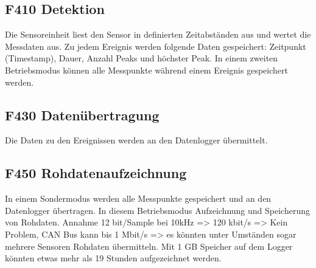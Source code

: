 \subsection{F410 Detektion}
Die Sensoreinheit liest den Sensor in definierten Zeitabständen aus und wertet die Messdaten aus. Zu jedem Ereignis werden folgende Daten gespeichert: Zeitpunkt (Timestamp), Dauer, Anzahl Peaks und höchster Peak. In einem zweiten Betriebsmodus können alle Messpunkte während einem Ereignis gespeichert werden.

\subsection{F430 Datenübertragung}
Die Daten zu den Ereignissen werden an den Datenlogger übermittelt.

\subsection{F450 Rohdatenaufzeichnung}
In einem Sondermodus werden alle Messpunkte gespeichert und an den Datenlogger übertragen. In diesem Betriebsmodus  Aufzeichnung und Speicherung von Rohdaten. Annahme 12 bit/Sample bei 10kHz => 120 kbit/s => Kein Problem, CAN Bus kann bis 1 Mbit/s => es könnten unter Umständen sogar mehrere Sensoren Rohdaten übermitteln. Mit 1 GB Speicher auf dem Logger könnten etwas mehr als 19 Stunden aufgezeichnet werden.

